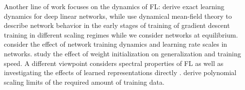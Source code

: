 Another line of work focuses on the dynamics of FL: \citet{Saxe14_iclr}
derive exact learning dynamics for deep linear networks, while \cite{Bordelon23_114009}
use dynamical mean-field theory to describe network behavior in the
early stages of training of gradient descent training in different
scaling regimes while we consider networks at equilibrium. \citet{Yang20_14522}
consider the effect of network training dynamics and learning rate
scales in networks. \citet{day2024} study the effect of weight initialization
on generalization and training speed. A different viewpoint considers
spectral properties of FL \cite{Simon23,Yang24} as well as investigating
the effects of learned representations directly \cite{Petrini23_114003}.
\citet{Maillard24} derive polynomial scaling limits of the required
amount of training data.